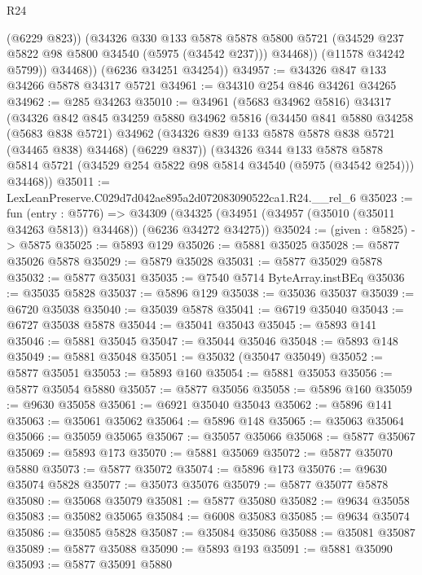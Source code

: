 \begin{lexlean}{R24}
\begin{coremodule}
                (@6229 @823))
              (@34326
                @330
                @133
                @5878
                @5878
                @5800
                @5721
                (@34529 @237 @5822 @98 @5800 @34540 (@5975 (@34542 @237)))
                @34468))
            (@11578 @34242 @5799))
          @34468))
      (@6236 @34251 @34254))
@34957 := @34326 @847 @133 @34266 @5878 @34317 @5721
@34961 := @34310 @254 @846 @34261 @34265
@34962 := @285 @34263
@35010 := @34961
    (@5683 @34962 @5816)
    @34317
    (@34326
      @842
      @845
      @34259
      @5880
      @34962
      @5816
      (@34450
        @841
        @5880
        @34258
        (@5683 @838 @5721)
        @34962
        (@34326 @839 @133 @5878 @5878 @838 @5721 (@34465 @838) @34468)
        (@6229 @837))
      (@34326
        @344
        @133
        @5878
        @5878
        @5814
        @5721
        (@34529 @254 @5822 @98 @5814 @34540 (@5975 (@34542 @254)))
        @34468))
@35011 := LexLeanPreserve.C029d7d042ae895a2d072083090522ca1.R24.__rel_6
@35023 := fun (entry : @5776) =>
  @34309 (@34325 (@34951 (@34957 (@35010 (@35011 @34263 @5813)) @34468)) (@6236 @34272 @34275))
@35024 := (given : @5825) -> @5875
@35025 := @5893 @129
@35026 := @5881 @35025
@35028 := @5877 @35026 @5878
@35029 := @5879 @35028
@35031 := @5877 @35029 @5878
@35032 := @5877 @35031
@35035 := @7540 @5714 ByteArray.instBEq
@35036 := @35035 @5828
@35037 := @5896 @129
@35038 := @35036 @35037
@35039 := @6720 @35038
@35040 := @35039 @5878
@35041 := @6719 @35040
@35043 := @6727 @35038 @5878
@35044 := @35041 @35043
@35045 := @5893 @141
@35046 := @5881 @35045
@35047 := @35044 @35046
@35048 := @5893 @148
@35049 := @5881 @35048
@35051 := @35032 (@35047 @35049)
@35052 := @5877 @35051
@35053 := @5893 @160
@35054 := @5881 @35053
@35056 := @5877 @35054 @5880
@35057 := @5877 @35056
@35058 := @5896 @160
@35059 := @9630 @35058
@35061 := @6921 @35040 @35043
@35062 := @5896 @141
@35063 := @35061 @35062
@35064 := @5896 @148
@35065 := @35063 @35064
@35066 := @35059 @35065
@35067 := @35057 @35066
@35068 := @5877 @35067
@35069 := @5893 @173
@35070 := @5881 @35069
@35072 := @5877 @35070 @5880
@35073 := @5877 @35072
@35074 := @5896 @173
@35076 := @9630 @35074 @5828
@35077 := @35073 @35076
@35079 := @5877 @35077 @5878
@35080 := @35068 @35079
@35081 := @5877 @35080
@35082 := @9634 @35058
@35083 := @35082 @35065
@35084 := @6008 @35083
@35085 := @9634 @35074
@35086 := @35085 @5828
@35087 := @35084 @35086
@35088 := @35081 @35087
@35089 := @5877 @35088
@35090 := @5893 @193
@35091 := @5881 @35090
@35093 := @5877 @35091 @5880

\end{coremodule}
\end{lexlean}

